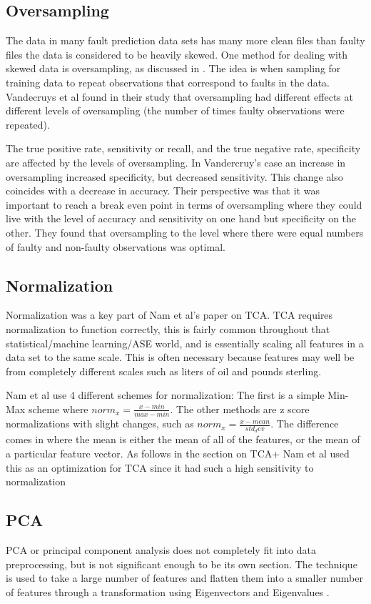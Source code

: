 \documentclass{sig-alternate-05-2015}
\begin{document}
\subsection{Oversampling}
The data in many fault prediction data sets has many more clean files than faulty files the data is considered to be heavily skewed.  One method for dealing with skewed data is oversampling, as discussed in \cite{Vandecruys}.  The idea is when sampling for training data to repeat observations that correspond to faults in the data.  Vandecruys et al found in their study that oversampling had different effects at different levels of oversampling (the number of times faulty observations were repeated).  

The true positive rate, sensitivity or recall, and the true negative rate, specificity are affected by the levels of oversampling.  In Vandercruy's case an increase in oversampling increased specificity, but decreased sensitivity.  This change also coincides with a decrease in accuracy.  Their perspective was that it was important to reach a break even point in terms of oversampling where they could live with the level of accuracy and sensitivity on one hand but specificity on the other.  They found that oversampling to the level where there were equal numbers of faulty and non-faulty observations was optimal\cite{Vandecruys}. 

\subsection{Normalization}
Normalization was a key part of Nam et al's paper on TCA.  TCA requires normalization to function correctly, this is fairly common throughout that statistical/machine learning/ASE world, and is essentially scaling all features in a data set to the same scale.  This is often necessary because features may well be from completely different scales such as liters of oil and pounds sterling.  

Nam et al use 4 different schemes for normalization: The first is a simple Min-Max scheme where $norm_x = \frac{x - min}{max - min}$. The other methods are z score normalizations with slight changes, such as $norm_x = \frac{x-mean}{std_dev}$.  The difference comes in where the mean is either the mean of all of the features, or the mean of a particular feature vector.  As follows in the section on TCA+ Nam et al used this as an optimization for TCA since it had such a high sensitivity to normalization\cite{Nam}

\subsection{PCA}
PCA or principal component analysis does not completely fit into data preprocessing, but is not significant enough to be its own section.  The technique is used to take a large number of features and flatten them into a smaller number of features through a transformation using Eigenvectors and Eigenvalues \cite{James}.  
\end{document}
